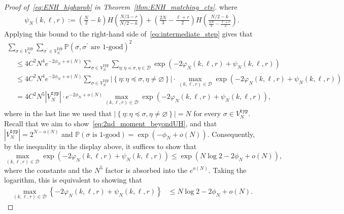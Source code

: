 \documentclass[11pt]{article}
\numberwithin{equation}{section}
\def\cD{{\mathcal D}}
\theoremstyle{definition}
\begin{document}
\begin{proof}[Proof of~\eqref{eq:ENH_highprob} in Theorem~\ref{thm:ENH_matching_cts}]
where 
\begin{align*}
   \psi_N(k, \ell, r)
   :=  \left( \frac{N}{2} - k \right) H \left( \frac{N/3-r}{N/2-k} \right) 
+ \left( \frac{2N}{3}  -  \frac{\ell + r}{2}  \right) H \left( \frac{N/2 - k}{\frac{2N}{3} -  \frac{\ell + r}{2}} \right) .
\end{align*}
Applying this bound to the right-hand side of~\eqref{eq:intermediate_step} gives that 
\begin{multline*}
      \sum_{\sigma \in V_N^{\mathtt{typ}}} \sum_{\sigma^\prime \in V_N^{\mathtt{typ}}} \mathbb{P} \left( \sigma, \sigma^\prime \text{ are 1-good}  \right)^{2} \\
\begin{aligned}
    &\leq   4 C^{2}  N^4 e^{-2\phi_N+o(N)}
        \sum_{\sigma \in V_N^{\mathtt{typ}}} \sum_{\eta: \eta \preccurlyeq \sigma, \eta \in \cD}   \exp\left({- 2\varphi_N(k,\ell,r)} + \psi_N(k,\ell,r)\right)\\
    &\leq   4 C^{2}  N^4 e^{-2\phi_N+o(N)}
        \sum_{\sigma \in V_N^{\mathtt{typ}}} \left|\left\{\eta: \eta \preccurlyeq \sigma, \eta \neq \varnothing \right\} \right| \cdot  \max_{(k,\ell,r)\in \cD}  \exp\left({- 2\varphi_N(k,\ell,r)} + \psi_N(k,\ell,r)\right) \\
    &= 4 C^{2}  N^5 \left| V_N^{\mathtt{typ}} \right| \cdot e^{-2\phi_N+o(N)} \max_{(k,\ell,r)\in \cD}  \exp\left({- 2\varphi_N(k,\ell,r)} + \psi_N(k,\ell,r)\right),
\end{aligned}
\end{multline*}
where in the last line we used that 
$\left|\left\{\eta: \eta \preccurlyeq \sigma, \eta \neq \varnothing \right\} \right| = N$ 
for every $\sigma \in V_N^{\mathtt{typ}}$. 
Recall that we aim to show~\eqref{eq:2nd_moment_beyondUH}, 
and that 
$\left| V_{N}^{\mathtt{typ}} \right| = 2^{N-o(N)}$ 
and 
$\mathbb{P} \left( \sigma \text{ is 1-good}  \right) = \exp( - \phi_{N} + o(N))$. 
Consequently, by the inequality in the display above, 
it suffices to show that 
\begin{equation}\label{eq:intermediate_step_two}
    \max_{(k,\ell,r)\in \cD} \exp\left({- 2\varphi_N(k,\ell,r)} + \psi_N(k,\ell,r)\right) 
    \leq \exp\left(N\log 2 - 2\phi_N + o(N)\right),
\end{equation}
where the constants and the $N^5$ factor is absorbed into the $e^{o(N)}$. Taking the logarithm, this is equivalent to showing that
\begin{align}\label{eq:maximization_problem}
     \max_{(k,\ell,r)\in \cD} \left\{ - 2\varphi_N(k,\ell,r) + \psi_N(k,\ell,r)\right\} & \leq N\log 2 - 2\phi_N + o(N).
\end{align}


\end{proof}
\end{document}
